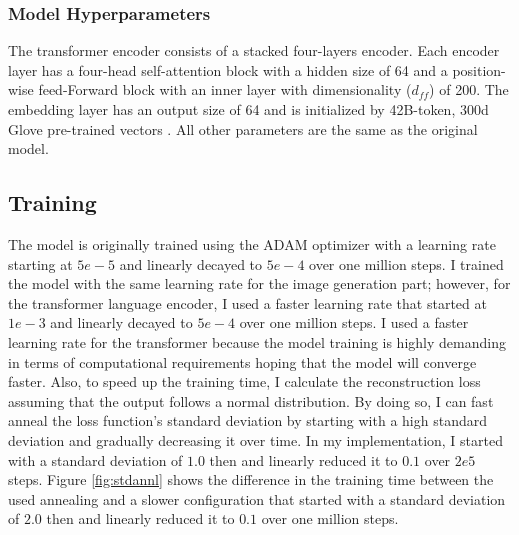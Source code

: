 \documentclass[11pt,a4paper]{article}
\begin{document}
\subsubsection{Model Hyperparameters}

The transformer encoder consists of a stacked four-layers encoder. Each encoder layer has a four-head self-attention block with a hidden size of 64 and a position-wise feed-Forward block with an inner layer with dimensionality ($d_{ff}$) of 200. The embedding layer has an output size of 64 and is initialized by 42B-token, 300d Glove pre-trained vectors \cite{pennington-etal-2014-glove}. All other parameters are the same as the original model. 

\subsection{Training} \label{sec:training}

The model is originally trained using the ADAM optimizer with a learning rate starting at $5e-5$ and linearly decayed to $5e-4$ over one million steps. I trained the model with the same learning rate for the image generation part; however, for the transformer language encoder, I used a faster learning rate that started at $1e-3$ and linearly decayed to $5e-4$ over one million steps. I used a faster learning rate for the transformer because the model training is highly demanding in terms of computational requirements hoping that the model will converge faster. Also, to speed up the training time, I calculate the reconstruction loss assuming that the output follows a normal distribution. By doing so, I can fast anneal the loss function's standard deviation by starting with a high standard deviation and gradually decreasing it over time. In my implementation, I started with a standard deviation of $1.0$ then and linearly reduced it to $0.1$ over $2e5$ steps. Figure \ref{fig:stdannl} shows the difference in the training time between the used annealing  and a slower configuration that started with a standard deviation of $2.0$ then and linearly reduced it to $0.1$ over one million steps.
\end{document}
